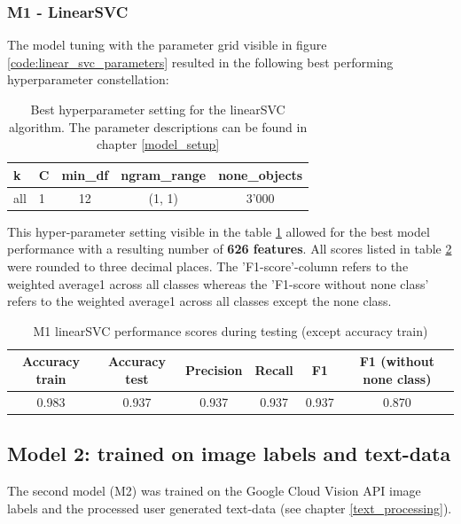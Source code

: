 \subsubsection{M1 - LinearSVC}
The model tuning with the parameter grid visible in figure \ref{code:linear_svc_parameters} resulted in the following best performing hyperparameter constellation:

\begin{table}[h!]
\begin{center}
\caption{Best hyperparameter setting for the linearSVC algorithm. The parameter descriptions can be found in chapter \ref{model_setup}}\vspace{1ex}
\label{tab:m1_linearSVC_bestParams}
\begin{tabular}{llccc}\hline
k & C & min\_df & ngram\_range & none\_objects \\ \hline
all & 1 & 12 & (1, 1) & 3'000 \\ \hline
\end{tabular}
\end{center}
\end{table}

This hyper-parameter setting visible in the table \ref{tab:m1_linearSVC_bestParams} allowed for the best model performance with a resulting number of \textbf{626 features}. All scores listed in table \ref{tab:m1_linearSVC_bestscores} were rounded to three decimal places. The 'F1-score'-column refers to the weighted average1 across all classes whereas the 'F1-score without none class' refers to the weighted average1 across all classes except the none class.

\begin{table}[h!]
\begin{center}
\caption{M1 linearSVC performance scores during testing (except accuracy train)}\vspace{1ex}
\label{tab:m1_linearSVC_bestscores}
\begin{tabular}{cccccc}\hline
Accuracy train & Accuracy test & Precision & Recall & F1 & F1 (without none class)\\ \hline
0.983 & 0.937 & 0.937 & 0.937 & 0.937 & 0.870 \\ \hline
\end{tabular}
\end{center}
\end{table}

\subsection{Model 2: trained on image labels and text-data}
The second model (M2) was trained on the Google Cloud Vision API image labels and the processed user generated text-data (see chapter \ref{text_processing}).

